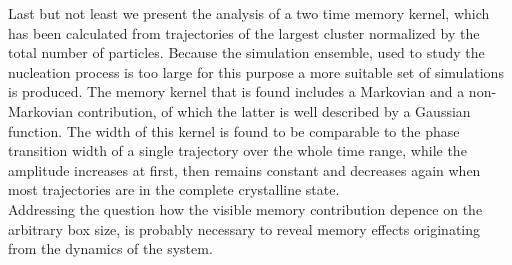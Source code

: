 {Last but not least we present the analysis of a two time memory kernel, which has been calculated from trajectories of the largest cluster normalized by the total number of particles. Because the simulation ensemble, used to study the nucleation process is too large for this purpose a more suitable set of simulations is produced. The memory kernel that is found includes a Markovian and a non-Markovian contribution, of which the latter is well described by a Gaussian function. The width of this kernel is found to be comparable to the phase transition width of a single trajectory over the whole time range, while the amplitude increases at first, then remains constant and decreases again when most trajectories are in the complete crystalline state.\\
Addressing the question how the visible memory contribution depence on the arbitrary box size, is probably necessary to reveal memory effects originating from the dynamics of the system.
}
